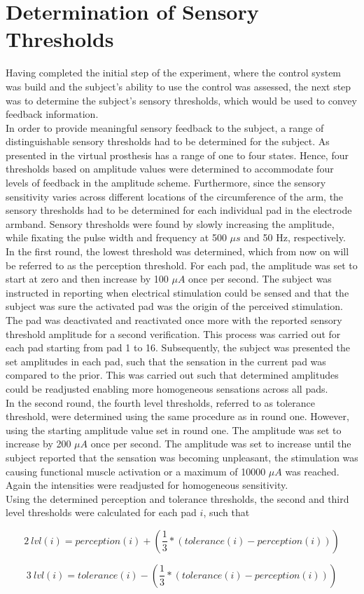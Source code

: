 
\section{Determination of Sensory Thresholds}

Having completed the initial step of the experiment, where the control system was build and the subject's ability to use the control was assessed, the next step was to determine the subject's sensory thresholds, which would be used to convey feedback information. \\
In order to provide meaningful sensory feedback to the subject, a range of distinguishable sensory thresholds had to be determined for the subject. As presented in  the virtual prosthesis has a range of one to four states. Hence, four thresholds based on amplitude values were determined to accommodate four levels of feedback in the amplitude scheme. Furthermore, since the sensory sensitivity varies across different locations of the circumference of the arm, the sensory thresholds had to be determined for each individual pad in the electrode armband. Sensory thresholds were found by slowly increasing the amplitude, while fixating the pulse width and frequency at 500 $\mu s $ and 50 Hz, respectively. \\
In the first round, the lowest threshold was determined, which from now on will be referred to as the perception threshold. For each pad, the amplitude was set to start at zero and then increase by 100 $\mu A $ once per second. The subject was instructed in reporting when electrical stimulation could be sensed and that the subject was sure the activated pad was the origin of the perceived stimulation. The pad was deactivated and reactivated once more with the reported sensory threshold amplitude for a second verification. This process was carried out for each pad starting from pad 1 to 16. Subsequently, the subject was presented the set amplitudes in each pad, such that the sensation in the current pad was compared to the prior. This was carried out such that determined amplitudes could be readjusted enabling more homogeneous sensations across all pads.  \\
In the second round, the fourth level thresholds, referred to as tolerance threshold, were determined using the same procedure as in round one. However, using the starting amplitude value set in round one. The amplitude was set to increase by 200 $\mu A $ once per second. The amplitude was set to increase until the subject reported that the sensation was becoming unpleasant, the stimulation was causing functional muscle activation or a maximum of 10000 $\mu A $ was reached. Again the intensities were readjusted for homogeneous sensitivity. \\ 
Using the determined perception and tolerance thresholds, the second and third level thresholds were calculated for each pad $i$, such that

\begin{equation}
2~lvl(i) = perception(i) + (\frac{1}{3} * (tolerance(i) - perception(i)))
\end{equation}

\begin{equation}
3~lvl(i) = tolerance(i) - (\frac{1}{3} * (tolerance(i) - perception(i)))
\end{equation}


       